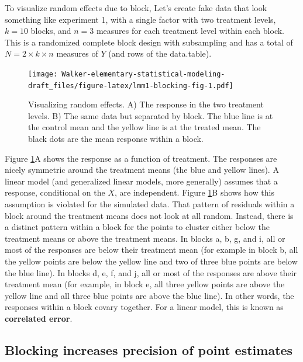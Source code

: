 \documentclass[]{book}
\begin{document}
To visualize random effects due to block, Let's create fake data that look something like experiment 1, with a single factor with two treatment levels, \(k=10\) blocks, and \(n=3\) measures for each treatment level within each block. This is a randomized complete block design with subsampling and has a total of \(N=2 \times k \times n\) measures of \(Y\) (and rows of the data.table).

\begin{figure}
\centering
\texttt{[image: Walker-elementary-statistical-modeling-draft\_files/figure-latex/lmm1-blocking-fig-1.pdf]}
\caption{\label{fig:lmm1-blocking-fig}Visualizing random effects. A) The response in the two treatment levels. B) The same data but separated by block. The blue line is at the control mean and the yellow line is at the treated mean. The black dots are the mean response within a block.}
\end{figure}

Figure \ref{fig:lmm1-blocking-fig}A shows the response as a function of treatment. The responses are nicely symmetric around the treatment means (the blue and yellow lines). A linear model (and generalized linear models, more generally) assumes that a response, conditional on the \(X\), are independent. Figure \ref{fig:lmm1-blocking-fig}B shows how this assumption is violated for the simulated data. That pattern of residuals within a block around the treatment means does not look at all random. Instead, there is a distinct pattern within a block for the points to cluster either below the treatment means or above the treatment means. In blocks a, b, g, and i, all or most of the responses are below their treatment mean (for example in block b, all the yellow points are below the yellow line and two of three blue points are below the blue line). In blocks d, e, f, and j, all or most of the responses are above their treatment mean (for example, in block e, all three yellow points are above the yellow line and all three blue points are above the blue line). In other words, the responses within a block covary together. For a linear model, this is known as \textbf{correlated error}.

\hypertarget{blocking-increases-precision-of-point-estimates}{%
\subsection{Blocking increases precision of point estimates}\label{blocking-increases-precision-of-point-estimates}}
\end{document}

